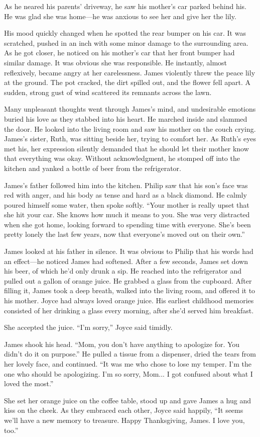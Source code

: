 As he neared his parents' driveway, he saw his mother's car parked behind his. He was glad she was home—he was anxious to see her and give her the lily.

His mood quickly changed when he spotted the rear bumper on his car. It was scratched, pushed in an inch with some minor damage to the surrounding area. As he got closer, he noticed on his mother's car that her front bumper had similar damage. It was obvious she was responsible. He instantly, almost reflexively, became angry at her carelessness. James violently threw the peace lily at the ground. The pot cracked, the dirt spilled out, and the flower fell apart. A sudden, strong gust of wind scattered its remnants across the lawn.

Many unpleasant thoughts went through James's mind, and undesirable emotions buried his love as they stabbed into his heart. He marched inside and slammed the door. He looked into the living room and saw his mother on the couch crying. James's sister, Ruth, was sitting beside her, trying to comfort her. As Ruth's eyes met his, her expression silently demanded that he should let their mother know that everything was okay. Without acknowledgment, he stomped off into the kitchen and yanked a bottle of beer from the refrigerator.

James's father followed him into the kitchen. Philip saw that his son's face was red with anger, and his body as tense and hard as a black diamond. He calmly poured himself some water, then spoke softly. “Your mother is really upset that she hit your car. She knows how much it means to you. She was very distracted when she got home, looking forward to spending time with everyone. She's been pretty lonely the last few years, now that everyone's moved out on their own.”

James looked at his father in silence. It was obvious to Philip that his words had an effect—he noticed James had softened. After a few seconds, James set down his beer, of which he'd only drunk a sip. He reached into the refrigerator and pulled out a gallon of orange juice. He grabbed a glass from the cupboard. After filling it, James took a deep breath, walked into the living room, and offered it to his mother. Joyce had always loved orange juice. His earliest childhood memories consisted of her drinking a glass every morning, after she'd served him breakfast.

She accepted the juice. “I'm sorry,” Joyce said timidly.

James shook his head. “Mom, you don't have anything to apologize for. You didn't do it on purpose.” He pulled a tissue from a dispenser, dried the tears from her lovely face, and continued. “It was me who chose to lose my temper. I'm the one who should be apologizing. I'm so sorry, Mom... I got confused about what I loved the most.”

She set her orange juice on the coffee table, stood up and gave James a hug and kiss on the cheek. As they embraced each other, Joyce said happily, “It seems we'll have a new memory to treasure. Happy Thanksgiving, James. I love you, too.”